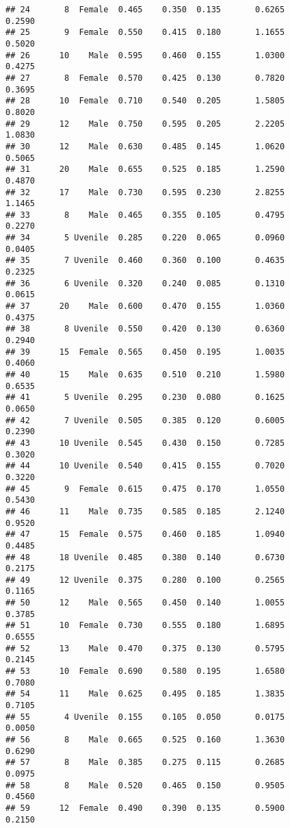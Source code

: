 \documentclass[
]{article}
\begin{document}
\begin{verbatim}
## 24       8  Female  0.465    0.350  0.135       0.6265         0.2590
## 25       9  Female  0.550    0.415  0.180       1.1655         0.5020
## 26      10    Male  0.595    0.460  0.155       1.0300         0.4275
## 27       8  Female  0.570    0.425  0.130       0.7820         0.3695
## 28      10  Female  0.710    0.540  0.205       1.5805         0.8020
## 29      12    Male  0.750    0.595  0.205       2.2205         1.0830
## 30      12    Male  0.630    0.485  0.145       1.0620         0.5065
## 31      20    Male  0.655    0.525  0.185       1.2590         0.4870
## 32      17    Male  0.730    0.595  0.230       2.8255         1.1465
## 33       8    Male  0.465    0.355  0.105       0.4795         0.2270
## 34       5 Uvenile  0.285    0.220  0.065       0.0960         0.0405
## 35       7 Uvenile  0.460    0.360  0.100       0.4635         0.2325
## 36       6 Uvenile  0.320    0.240  0.085       0.1310         0.0615
## 37      20    Male  0.600    0.470  0.155       1.0360         0.4375
## 38       8 Uvenile  0.550    0.420  0.130       0.6360         0.2940
## 39      15  Female  0.565    0.450  0.195       1.0035         0.4060
## 40      15    Male  0.635    0.510  0.210       1.5980         0.6535
## 41       5 Uvenile  0.295    0.230  0.080       0.1625         0.0650
## 42       7 Uvenile  0.505    0.385  0.120       0.6005         0.2390
## 43      10 Uvenile  0.545    0.430  0.150       0.7285         0.3020
## 44      10 Uvenile  0.540    0.415  0.155       0.7020         0.3220
## 45       9  Female  0.615    0.475  0.170       1.0550         0.5430
## 46      11    Male  0.735    0.585  0.185       2.1240         0.9520
## 47      15  Female  0.575    0.460  0.185       1.0940         0.4485
## 48      18 Uvenile  0.485    0.380  0.140       0.6730         0.2175
## 49      12 Uvenile  0.375    0.280  0.100       0.2565         0.1165
## 50      12    Male  0.565    0.450  0.140       1.0055         0.3785
## 51      10  Female  0.730    0.555  0.180       1.6895         0.6555
## 52      13    Male  0.470    0.375  0.130       0.5795         0.2145
## 53      10  Female  0.690    0.580  0.195       1.6580         0.7080
## 54      11    Male  0.625    0.495  0.185       1.3835         0.7105
## 55       4 Uvenile  0.155    0.105  0.050       0.0175         0.0050
## 56       8    Male  0.665    0.525  0.160       1.3630         0.6290
## 57       8    Male  0.385    0.275  0.115       0.2685         0.0975
## 58       8    Male  0.520    0.465  0.150       0.9505         0.4560
## 59      12  Female  0.490    0.390  0.135       0.5900         0.2150

\end{verbatim}
\end{document}
